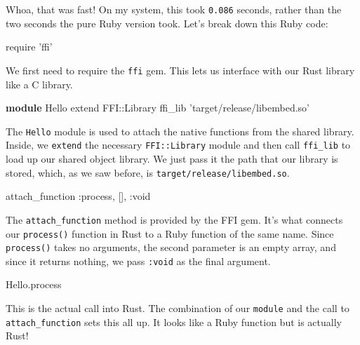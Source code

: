 \documentclass[a4paper,]{book}
\newenvironment{Shaded}{\begin{snugshade}}{\end{snugshade}}
\newcommand{\KeywordTok}[1]{\textcolor[rgb]{0.13,0.29,0.53}{\textbf{{#1}}}}
\newcommand{\DataTypeTok}[1]{\textcolor[rgb]{0.13,0.29,0.53}{{#1}}}
\newcommand{\StringTok}[1]{\textcolor[rgb]{0.31,0.60,0.02}{{#1}}}
\newcommand{\NormalTok}[1]{{#1}}
\begin{document}
Whoa, that was fast! On my system, this took \texttt{0.086} seconds,
rather than the two seconds the pure Ruby version took. Let's break down
this Ruby code:

\begin{Shaded}
\begin{Highlighting}[]
\NormalTok{require }\StringTok{'ffi'}
\end{Highlighting}
\end{Shaded}

We first need to require the \texttt{ffi} gem. This lets us interface
with our Rust library like a C library.

\begin{Shaded}
\begin{Highlighting}[]
\KeywordTok{module} \DataTypeTok{Hello}
  \NormalTok{extend }\DataTypeTok{FFI}\NormalTok{::}\DataTypeTok{Library}
  \NormalTok{ffi_lib }\StringTok{'target/release/libembed.so'}
\end{Highlighting}
\end{Shaded}

The \texttt{Hello} module is used to attach the native functions from
the shared library. Inside, we \texttt{extend} the necessary
\texttt{FFI::Library} module and then call \texttt{ffi\_lib} to load up
our shared object library. We just pass it the path that our library is
stored, which, as we saw before, is \texttt{target/release/libembed.so}.

\begin{Shaded}
\begin{Highlighting}[]
\NormalTok{attach_function }\StringTok{:process}\NormalTok{, [], }\StringTok{:void}
\end{Highlighting}
\end{Shaded}

The \texttt{attach\_function} method is provided by the FFI gem. It's
what connects our \texttt{process()} function in Rust to a Ruby function
of the same name. Since \texttt{process()} takes no arguments, the
second parameter is an empty array, and since it returns nothing, we
pass \texttt{:void} as the final argument.

\begin{Shaded}
\begin{Highlighting}[]
\DataTypeTok{Hello}\NormalTok{.process}
\end{Highlighting}
\end{Shaded}

This is the actual call into Rust. The combination of our
\texttt{module} and the call to \texttt{attach\_function} sets this all
up. It looks like a Ruby function but is actually Rust!
\end{document}
